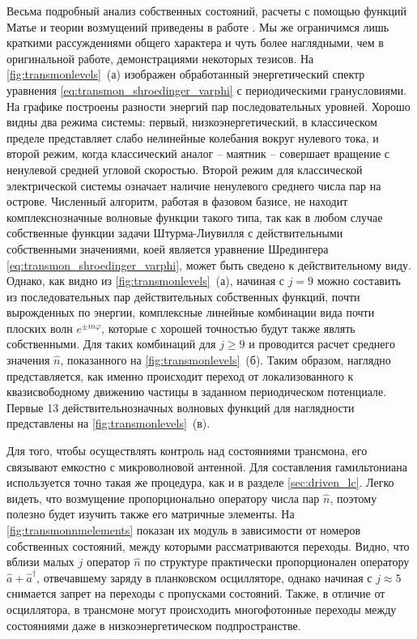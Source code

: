 \documentclass[14pt, a4paper]{extreport}
\numberwithin{equation}{section}
\begin{document}
Весьма подробный анализ собственных состояний, расчеты с помощью функций Матье и теории возмущений приведены в работе \cite{koch2007charge}. Мы же ограничимся лишь краткими рассуждениями общего характера и чуть более наглядными, чем в оригинальной работе, демонстрациями некоторых тезисов. На \autoref{fig:transmonlevels}~(а) изображен обработанный энергетический спектр уравнения \eqref{eq:transmon_shroedinger_varphi} с периодическими гранусловиями. На графике построены разности энергий пар последовательных уровней. Хорошо видны два режима системы: первый, низкоэнергетический, в классическом пределе представляет слабо нелинейные колебания вокруг нулевого тока, и второй режим, когда классический аналог -- маятник -- совершает вращение с ненулевой средней угловой скоростью. Второй режим для классической электрической системы означает наличие ненулевого среднего числа пар на острове. Численный алгоритм, работая в фазовом базисе, не находит комплекснозначные волновые функции такого типа, так как в любом случае собственные функции задачи Штурма-Лиувилля с действительными собственными значениями, коей является уравнение Шредингера \eqref{eq:transmon_shroedinger_varphi}, может быть сведено к действительному виду. Однако, как видно из \autoref{fig:transmonlevels}~(а), начиная с $j=9$ можно составить из последовательных пар действительных собственных функций, почти вырожденных по энергии, комплексные линейные комбинации вида почти плоских волн $e^{\pm i n \varphi}$, которые с хорошей точностью будут также являть собственными. Для таких комбинаций для $j\geq 9$ и проводится расчет среднего значения $\hat n$, показанного на \autoref{fig:transmonlevels}~(б). Таким образом, наглядно представляется, как именно происходит переход от локализованного к квазисвободному движению частицы в заданном периодическом потенциале. Первые 13 действительнозначных волновых функций для наглядности представлены на \autoref{fig:transmonlevels}~(в).

Для того, чтобы осуществлять контроль над состояниями трансмона, его связывают емкостно с микроволновой антенной. Для составления гамильтониана используется точно такая же процедура, как и в разделе \ref{sec:driven_lc}. Легко видеть, что возмущение пропорционально оператору числа пар $\hat n$, поэтому полезно будет изучить также его матричные элементы. На \autoref{fig:transmonnmelements} показан их модуль в зависимости от номеров собственных состояний, между которыми рассматриваются переходы. Видно, что вблизи малых $j$ оператор $\hat n$ по структуре практически пропорционален оператору $\hat a + \hat a^\dag$, отвечавшему заряду в планковском осцилляторе, однако начиная с $j\approx 5$ снимается запрет на переходы с пропусками состояний. Также, в отличие от осциллятора, в трансмоне могут происходить многофотонные переходы между состояниями даже в низкоэнергетическом подпространстве.
\end{document}
